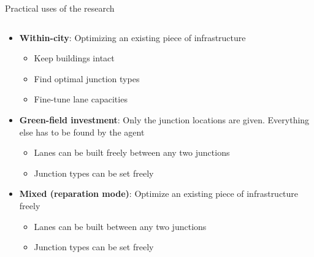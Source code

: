 \documentclass[english, aspectratio=169]{beamer}
\begin{document}
\begin{frame}{Practical uses of the research}
\begin{columns}

\begin{column}{0.75\textwidth}
\begin{itemize}
	\item<1-> \textbf{Within-city}: Optimizing an existing piece of infrastructure
	\begin{itemize}
		\item Keep buildings intact
		\item Find optimal junction types
		\item Fine-tune lane capacities
	\end{itemize}
	\item<2-> \textbf{Green-field investment}: Only the junction locations are given. Everything else has to be found by the agent
	\begin{itemize}
		\item Lanes can be built freely between any two junctions
		\item Junction types can be set freely
	\end{itemize}
	\item<3-> \textbf{Mixed (reparation mode)}: Optimize an existing piece of infrastructure freely
	\begin{itemize}
		\item Lanes can be built between any two junctions
		\item Junction types can be set freely
	\end{itemize}
\end{itemize}
\end{column}


\end{columns}
\end{frame}
\end{document}
